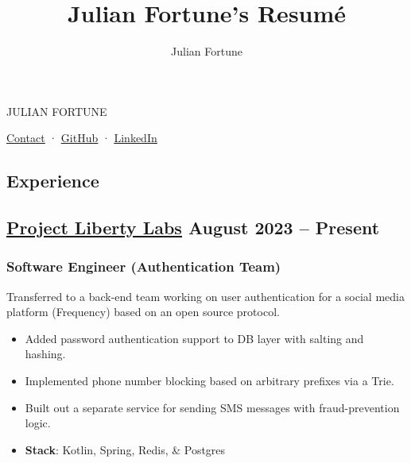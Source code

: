 \documentclass[10pt]{article} %
\title{Julian Fortune's Resumé}
\author{Julian Fortune}
\providecommand{\tightlist}{%
  \setlength{\itemsep}{0pt}\setlength{\parskip}{0pt}}
\let\defaultref\href
\renewcommand{\href}[2]{%
  \defaultref{#1}{\ul{#2}}%
}
\newcommand{\link}[2]{\href{#1}{#2}}
\def\separator{ · {}}
\begin{document}
\begin{bfseries}\begin{huge}
  {\selectfont%
    \MakeTextUppercase{Julian Fortune}
  }
\end{huge}\end{bfseries}

  \link{https://forms.gle/KkSirNbEgQozTH2x7}{Contact}\separator%
    \link{http://github.com/julianfortune}{GitHub}\separator%
\link{http://linkedin.com/in/julianfortune}{LinkedIn}%


\begin{paracol}{2}
\setlength{\columnsep}{1em}

\hypertarget{experience}{%
\section{Experience}\label{experience}}

\hypertarget{project-liberty-labs-august-2023-present}{%
\subsection{\texorpdfstring{\href{https://www.projectliberty.io/labs/}{Project
Liberty Labs} \hfill \small August 2023 --
Present}{Project Liberty Labs August 2023 -- Present}}\label{project-liberty-labs-august-2023-present}}

\vspace{-5pt}

\hypertarget{software-engineer-authentication-team}{%
\subsubsection{\texorpdfstring{\small Software Engineer (Authentication
Team)}{Software Engineer (Authentication Team)}}\label{software-engineer-authentication-team}}

Transferred to a back-end team working on user authentication for a
social media platform (Frequency) based on an open source protocol.

\begin{itemize}
\tightlist
\item
  Added password authentication support to DB layer with salting and
  hashing.
\item
  Implemented phone number blocking based on arbitrary prefixes via a
  Trie.
\item
  Built out a separate service for sending SMS messages with
  fraud-prevention logic.
\item
  \textbf{Stack}: Kotlin, Spring, Redis, \& Postgres
\end{itemize}


\end{paracol}
\end{document}
